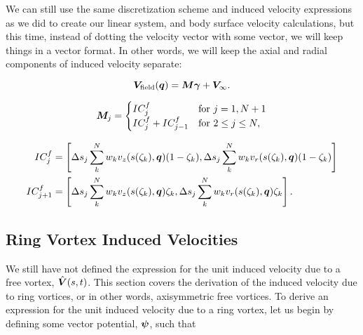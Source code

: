 We can still use the same discretization scheme and induced velocity expressions as we did to create our linear system, and body surface velocity calculations, but this time, instead of dotting the velocity vector with some vector, we will keep things in a vector format.
%
In other words, we will keep the axial and radial components of induced velocity separate:

\begin{equation}
    \bm{V}_\text{field}(\bm{q}) = \bm{M}\bm{\gamma}  + \bm{V}_\infty.
\end{equation}

\where

\begin{equation}
\vect{M}_{j}=
    \begin{cases}
        IC^f_{j}        \hfill & \text{for }j=1,N+1 \\
        IC^f_{j} + IC^f_{j-1} & \text{for }2 \leq j \leq N,
    \end{cases}
\end{equation}

\where

\begin{equation}
    \begin{aligned}
        IC^f_{j} &= \left[\Delta s_j\sum_k^N  w_k v_z(s(\zeta_k),\bm{q}) (1-\zeta_k),   \Delta s_j\sum_k^N w_k v_r(s(\zeta_k),\bm{q}) (1-\zeta_k)\right] \\
    IC^f_{j+1} &=\left[ \Delta s_j\sum_k^N w_k v_z(s(\zeta_k),\bm{q}) \zeta_k,  \Delta s_j\sum_k^N w_k v_r(s(\zeta_k),\bm{q}) \zeta_k\right].
    \end{aligned}
\end{equation}

\subsection{Ring Vortex Induced Velocities}
\label{ssec:ringvortices}

We still have not defined the expression for the unit induced velocity due to a free vortex, \(\hat{\bm{V}}(s,t)\).
%
This section covers the derivation of the induced velocity due to ring vortices, or in other words, axisymmetric free vortices.
%
To derive an expression for the unit induced velocity due to a ring vortex, let us begin by defining some vector potential, \(\bm{\psi}\), such that

